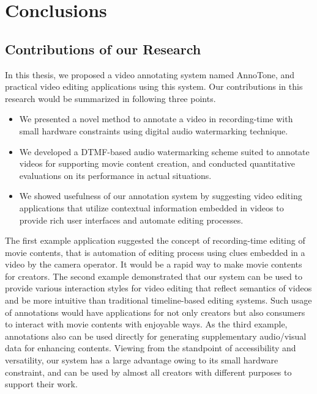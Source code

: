 \chapter{Conclusions}

\section{Contributions of our Research}
In this thesis, we proposed a video annotating system named AnnoTone, and practical video editing applications using this system.
Our contributions in this research would be summarized in following three points.
\begin{itemize}
\item We presented a novel method to annotate a video in recording-time with small hardware constraints using digital audio watermarking technique.
\item We developed a DTMF-based audio watermarking scheme suited to annotate videos for supporting movie content creation, and conducted quantitative evaluations on its performance in actual situations.
\item We showed usefulness of our annotation system by suggesting video editing applications that utilize contextual information embedded in videos to provide rich user interfaces and automate editing processes.
\end{itemize}
The first example application suggested the concept of recording-time editing of movie contents, that is automation of editing process using clues embedded in a video by the camera operator.
It would be a rapid way to make movie contents for creators.
The second example demonstrated that our system can be used to provide various interaction styles for video editing that reflect semantics of videos and be more intuitive than traditional timeline-based editing systems.
Such usage of annotations would have applications for not only creators but also consumers to interact with movie contents with enjoyable ways.
As the third example, annotations also can be used directly for generating supplementary audio/visual data for enhancing contents.
Viewing from the standpoint of accessibility and versatility, our system has a large advantage owing to its small hardware constraint, and can be used by almost all creators with different purposes to support their work.


